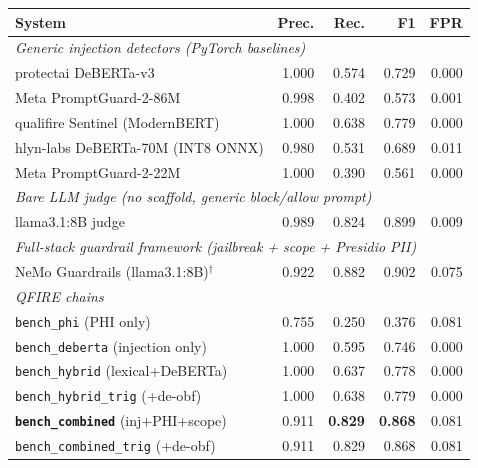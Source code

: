 \begin{tabular}{lrrrr}
\toprule
System & Prec. & Rec. & F1 & FPR \\
\midrule
\multicolumn{5}{l}{\emph{Generic injection detectors (PyTorch baselines)}} \\
\quad protectai DeBERTa-v3            & 1.000 & 0.574 & 0.729 & 0.000 \\
\quad Meta PromptGuard-2-86M          & 0.998 & 0.402 & 0.573 & 0.001 \\
\quad qualifire Sentinel (ModernBERT) & 1.000 & 0.638 & 0.779 & 0.000 \\
\quad hlyn-labs DeBERTa-70M (INT8 ONNX) & 0.980 & 0.531 & 0.689 & 0.011 \\
\quad Meta PromptGuard-2-22M          & 1.000 & 0.390 & 0.561 & 0.000 \\
\midrule
\multicolumn{5}{l}{\emph{Bare LLM judge (no scaffold, generic block/allow prompt)}} \\
\quad llama3.1:8B judge               & 0.989 & 0.824 & 0.899 & 0.009 \\
\midrule
\multicolumn{5}{l}{\emph{Full-stack guardrail framework (jailbreak + scope + Presidio PII)}} \\
\quad NeMo Guardrails (llama3.1:8B)$^\dagger$ & 0.922 & 0.882 & 0.902 & 0.075 \\
\midrule
\multicolumn{5}{l}{\emph{QFIRE chains}} \\
\quad \texttt{bench\_phi} (PHI only)              & 0.755 & 0.250 & 0.376 & 0.081 \\
\quad \texttt{bench\_deberta} (injection only)    & 1.000 & 0.595 & 0.746 & 0.000 \\
\quad \texttt{bench\_hybrid} (lexical+DeBERTa)    & 1.000 & 0.637 & 0.778 & 0.000 \\
\quad \texttt{bench\_hybrid\_trig} (+de-obf)      & 1.000 & 0.638 & 0.779 & 0.000 \\
\quad \textbf{\texttt{bench\_combined}} (inj+PHI+scope) & 0.911 & \textbf{0.829} & \textbf{0.868} & 0.081 \\
\quad \texttt{bench\_combined\_trig} (+de-obf)    & 0.911 & 0.829 & 0.868 & 0.081 \\
\bottomrule
\end{tabular}

